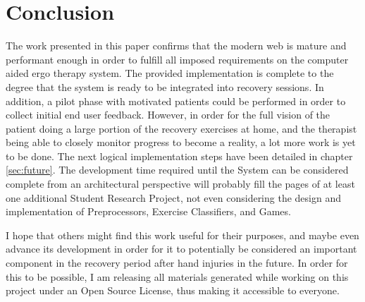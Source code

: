\chapter{Conclusion}
\label{sec:conclusion}
The work presented in this paper confirms that the modern web is mature and performant enough in order to fulfill all imposed requirements on the computer aided ergo therapy system. The provided implementation is complete to the degree that the system is ready to be integrated into recovery sessions. In addition, a pilot phase with motivated patients could be performed in order to collect initial end user feedback. However, in order for the full vision of the patient doing a large portion of the recovery exercises at home, and the therapist being able to closely monitor progress to become a reality, a lot more work is yet to be done. The next logical implementation steps have been detailed in chapter \ref{sec:future}. The development time required until the System can be considered complete from an architectural perspective will probably fill the pages of at least one additional Student Research Project, not even considering the design and implementation of Preprocessors, Exercise Classifiers, and Games.

I hope that others might find this work useful for their purposes, and maybe even advance its development in order for it to potentially be considered an important component in the recovery period after hand injuries in the future. In order for this to be possible, I am releasing all materials generated while working on this project under an Open Source License, thus making it accessible to everyone.